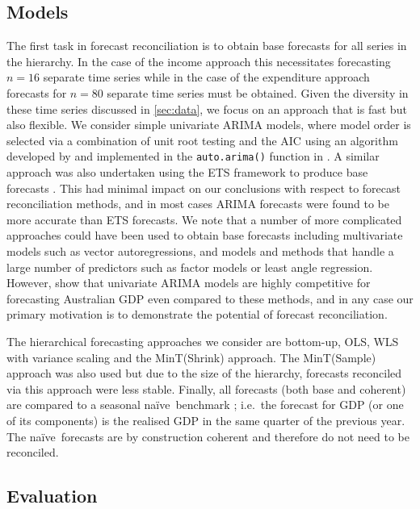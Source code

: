 \documentclass[graybox]{svmult}
\def\naive{na\"{i}ve\ }
\begin{document}
\subsection{Models}

The first task in forecast reconciliation is to obtain base forecasts for all series in the hierarchy. In the case of the income approach this necessitates forecasting $n=16$ separate time series while in the case of the expenditure approach forecasts for $n=80$ separate time series must be obtained. Given the diversity in these time series discussed in \autoref{sec:data}, we focus on an approach that is fast but also flexible. We consider simple univariate ARIMA models, where model order is selected via a combination of unit root testing and the AIC using an algorithm developed by \citet{HK08} and implemented in the \verb|auto.arima()| function in \citet{Rforecast}. A similar approach was also undertaken using the ETS framework to produce base forecasts \citep{expsmooth08}. This had minimal impact on our conclusions with respect to forecast reconciliation methods, and in most cases ARIMA forecasts were found to be more accurate than ETS forecasts. We note that a number of more complicated approaches could have been used to obtain base forecasts including multivariate models such as vector autoregressions, and models and methods that handle a large number of predictors such as factor models or least angle regression. However, \citet{PanEtAl2019} show that univariate ARIMA models are highly competitive for forecasting Australian GDP even compared to these methods, and in any case our primary motivation is to demonstrate the potential of forecast reconciliation.

The hierarchical forecasting approaches we consider are bottom-up, OLS, WLS with variance scaling and the MinT(Shrink) approach. The MinT(Sample) approach was also used but due to the size of the hierarchy, forecasts reconciled via this approach were less stable. Finally, all forecasts (both base and coherent) are compared to a seasonal \naive benchmark \citep{HynAth2018}; i.e.\ the forecast for GDP (or one of its components) is the realised GDP in the same quarter of the previous year. The \naive forecasts are by construction coherent and therefore do not need to be reconciled.

\subsection{Evaluation}
\end{document}
